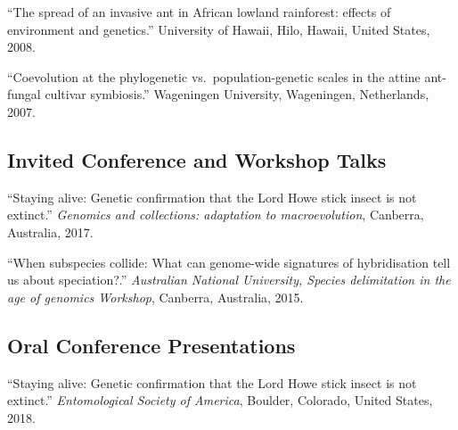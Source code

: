 \documentclass[11pt]{article}
\def\printdate#1{\xprintdate#1-}
\def\xprintdate#1-#2-#3-{#1}
\begin{document}
\ind ``The spread of an invasive ant in African lowland rainforest: effects of
environment and genetics.'' University of Hawaii, Hilo, Hawaii, United States, \printdate{2008-00-00}.


\ind ``Coevolution at the phylogenetic vs.~population-genetic scales in the
attine ant-fungal cultivar symbiosis.'' Wageningen University, Wageningen, Netherlands, \printdate{2007-00-00}.



\subsection{Invited Conference and Workshop Talks}







\ind ``Staying alive: Genetic confirmation that the Lord Howe stick insect is
not extinct.'' \emph{Genomics and collections: adaptation to macroevolution}, Canberra, Australia, \printdate{2017-06-14}.












\ind ``When subspecies collide: What can genome-wide signatures of
hybridisation tell us about speciation?.'' \emph{Australian National University, Species delimitation in the age of
genomics Workshop}, Canberra, Australia, \printdate{2015-00-00}.


























\subsection{Oral Conference Presentations}






\ind ``Staying alive: Genetic confirmation that the Lord Howe stick insect is
not extinct.'' \emph{Entomological Society of America}, Boulder, Colorado, United States, \printdate{2018-00-00}.
\end{document}
